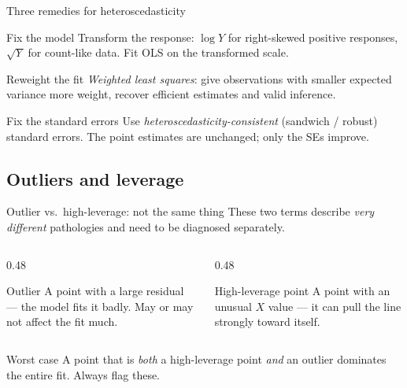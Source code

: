 \documentclass[aspectratio=169,11pt]{beamer}
\begin{document}
\begin{frame}{Three remedies for heteroscedasticity}
  \begin{block}{Fix the model}
    Transform the response: $\log Y$ for right-skewed positive
    responses, $\sqrt{Y}$ for count-like data. Fit OLS on the
    transformed scale.
  \end{block}
  \begin{block}{Reweight the fit}
    \emph{Weighted least squares}: give observations with smaller
    expected variance more weight, recover efficient estimates and
    valid inference.
  \end{block}
  \begin{block}{Fix the standard errors}
    Use \emph{heteroscedasticity-consistent} (sandwich / robust)
    standard errors. The point estimates are unchanged; only the SEs
    improve.
  \end{block}
\end{frame}

\subsection{Outliers and leverage}

\begin{frame}{Outlier vs.\ high-leverage: not the same thing}
  These two terms describe \emph{very different} pathologies and need
  to be diagnosed separately.
  \begin{columns}[T]
    \begin{column}{0.48\textwidth}
      \begin{block}{Outlier}
        A point with a large residual --- the model fits it badly.
        May or may not affect the fit much.
      \end{block}
    \end{column}
    \begin{column}{0.48\textwidth}
      \begin{block}{High-leverage point}
        A point with an unusual $X$ value --- it can pull the line
        strongly toward itself.
      \end{block}
    \end{column}
  \end{columns}
  \begin{alertblock}{Worst case}
    A point that is \emph{both} a high-leverage point \emph{and} an
    outlier dominates the entire fit. Always flag these.
  \end{alertblock}
\end{frame}
\end{document}
